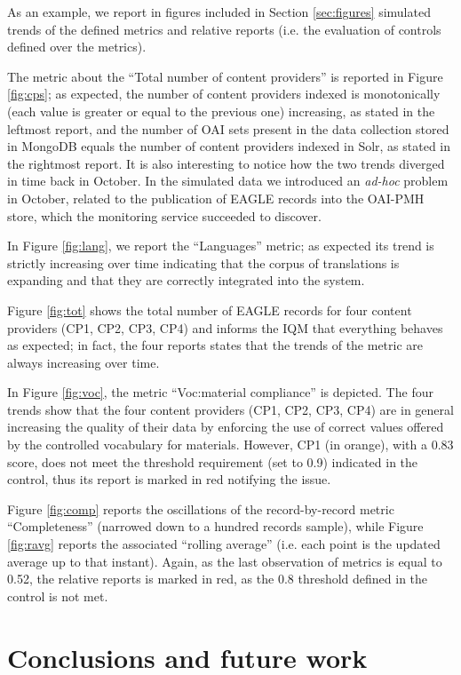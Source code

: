 \documentclass[amsthm,ebook]{saparticle}
\begin{document}
\newpage
As an example, we report in figures included in Section \ref{sec:figures} simulated trends of the defined metrics and relative reports (i.e. the evaluation of controls defined over the metrics).

The metric about the ``Total number of content providers'' is reported in Figure \ref{fig:cps}; as expected, the number of content providers indexed is monotonically (each value is greater or equal to the previous one) increasing, as stated in the leftmost report, and the number of OAI sets present in the data collection stored in MongoDB equals the number of content providers indexed in Solr, as stated in the rightmost report. It is also interesting to notice how the two trends diverged in time back in October. In the simulated data we introduced an \textit{ad-hoc} problem in October, related to the publication of EAGLE records into the OAI-PMH store, which the monitoring service succeeded to discover.

In Figure \ref{fig:lang}, we report the ``Languages'' metric; as expected its trend is strictly increasing over time indicating that the corpus of translations is expanding and that they are correctly integrated into the system.

Figure \ref{fig:tot} shows the total number of EAGLE records for four content providers (CP1, CP2, CP3, CP4) and informs the IQM that everything behaves as expected; in fact, the four reports states that the trends of the metric are always increasing over time.

In Figure \ref{fig:voc}, the metric ``Voc:material compliance'' is depicted. The four trends show that the four content providers (CP1, CP2, CP3, CP4) are in general increasing the quality of their data by enforcing the use of correct values offered by the controlled vocabulary for materials. However, CP1 (in orange), with a 0.83 score, does not meet the threshold requirement (set to 0.9) indicated in the control, thus its report is marked in red notifying the issue.

Figure \ref{fig:comp} reports the oscillations of the record-by-record metric ``Completeness'' (narrowed down to a hundred records sample), while Figure \ref{fig:ravg} reports the associated ``rolling average'' (i.e. each point is the updated average up to that instant). Again, as the last observation of metrics is equal to 0.52, the relative reports is marked in red, as the 0.8 threshold defined in the control is not met.


\newpage
\section{Conclusions and future work}\label{sec:conclusions}
\end{document}
